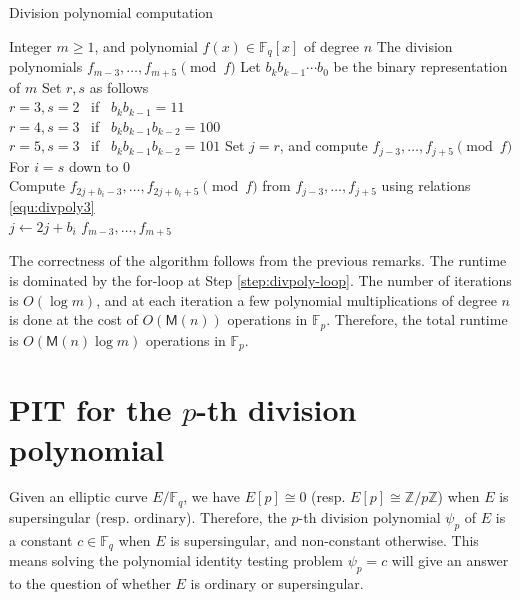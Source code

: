\documentclass[12pt]{article}
\theoremstyle{plain}
\theoremstyle{definition}
\def\Z{\ensuremath{\mathbb{Z}}}
\def\F{\ensuremath{\mathbb{F}}}
\def\MM{\ensuremath{\mathsf{M}}}
\begin{document}
\begin{algorithm}[H]
	\caption{Division polynomial computation}
	\label{alg:divpoly-comp}
	\begin{algorithmic}[1]
		\REQUIRE Integer $m \ge 1$, and polynomial $f(x) \in \F_q[x]$ of degree $n$
		\ENSURE The division polynomials $f_{m - 3}, \dots, f_{m + 5} \pmod{f}$
		\STATE Let $b_kb_{k - 1} \cdots b_0$ be the binary representation of $m$
		\STATE Set $r, s$ as follows \\
		$r = 3, s = 2$~ if~ $b_kb_{k - 1} = 11$ \\
		$r = 4, s = 3$~ if~ $b_kb_{k - 1}b_{k - 2} = 100$ \\
		$r = 5, s = 3$~ if~ $b_kb_{k - 1}b_{k - 2} = 101$
		\STATE Set $j = r$, and compute $f_{j - 3}, \dots, f_{j + 5} \pmod{f}$
		\STATE\label{step:divpoly-loop} 
		For $i = s$ down to $0$ \\
		Compute $f_{2j + b_i - 3}, \dots, f_{2j + b_i + 5} \pmod{f}$ from $f_{j - 3}, \dots, f_{j + 
		5}$ using relations \eqref{equ:divpoly3} \\
		$j \leftarrow 2j + b_i$
		\RETURN $f_{m - 3}, \dots, f_{m + 5}$
	\end{algorithmic}
\end{algorithm}

The correctness of the algorithm follows from the previous remarks. The runtime is dominated by 
the for-loop at Step \ref{step:divpoly-loop}. The number of iterations is $O(\log m)$, and at each 
iteration a few polynomial multiplications of degree $n$ is done at the cost of $O(\MM(n))$ 
operations in $\F_p$. Therefore, the total runtime is $O(\MM(n)\log m)$ operations in $\F_p$.




\section{PIT for the $p$-th division polynomial}
\label{sec:pit-for-div}

Given an elliptic curve $E/\F_q$, we have $E[p] \cong 0$ (resp. $E[p] \cong \Z / p\Z$) when $E$ is 
supersingular (resp. ordinary). Therefore, the $p$-th division polynomial $\psi_p$ of $E$ is a 
constant $c \in \F_q$ when $E$ is supersingular, and non-constant otherwise. This means solving the 
polynomial identity testing problem $\psi_p = c$ will give an answer to the question of whether $E$ 
is ordinary or supersingular. 
\end{document}
